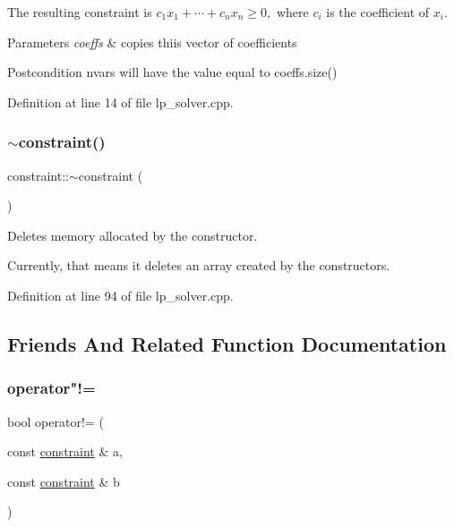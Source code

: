 The resulting constraint is $ c_1x_1 + \cdots + c_nx_n \geq 0, $ where $ c_i $ is the coefficient of $ x_i $. 
\begin{DoxyParams}{Parameters}
{\em coeffs} & copies thiis vector of coefficients \\
\hline
\end{DoxyParams}
\begin{DoxyPostcond}{Postcondition}
{\ttfamily nvars} will have the value equal to {\ttfamily coeffs.\+size()} 
\end{DoxyPostcond}


Definition at line 14 of file lp\+\_\+solver.\+cpp.

\mbox{\label{classconstraint_a02e58b1ce0b271e3daac2da841152582}} 
\subsubsection{\texorpdfstring{$\sim$constraint()}{~constraint()}}
{\footnotesize\ttfamily constraint\+::$\sim$constraint (\begin{DoxyParamCaption}{ }\end{DoxyParamCaption})}



Deletes memory allocated by the constructor. 

Currently, that means it deletes an array created by the constructors. 

Definition at line 94 of file lp\+\_\+solver.\+cpp.



\subsection{Friends And Related Function Documentation}
\mbox{\label{classconstraint_a6b57d19474acdea10ab0a0e954ef3ef9}} 
\subsubsection{\texorpdfstring{operator"!=}{operator!=}\hspace{0.1cm}{\footnotesize\ttfamily [1/2]}}
{\footnotesize\ttfamily bool operator!= (\begin{DoxyParamCaption}\item[{const \hyperlink{classconstraint}{constraint} \&}]{a,  }\item[{const \hyperlink{classconstraint}{constraint} \&}]{b }\end{DoxyParamCaption})\hspace{0.3cm}{\ttfamily [friend]}}



